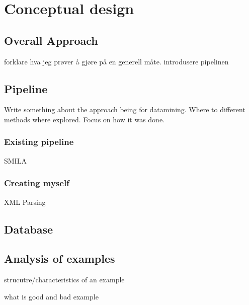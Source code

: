 
\chapter{Conceptual design}

\section{Overall Approach}

forklare hva jeg prøver å gjøre på en generell måte. introdusere pipelinen



\section{Pipeline}

Write something about the approach being for datamining. Where to different methods where explored. Focus on how it was done.

\subsection{Existing pipeline}

SMILA

\subsection{Creating myself}

XML Parsing

\section{Database}

\section{Analysis of examples}
strucutre/characteristics of an example

what is good and bad example

\cleardoublepage